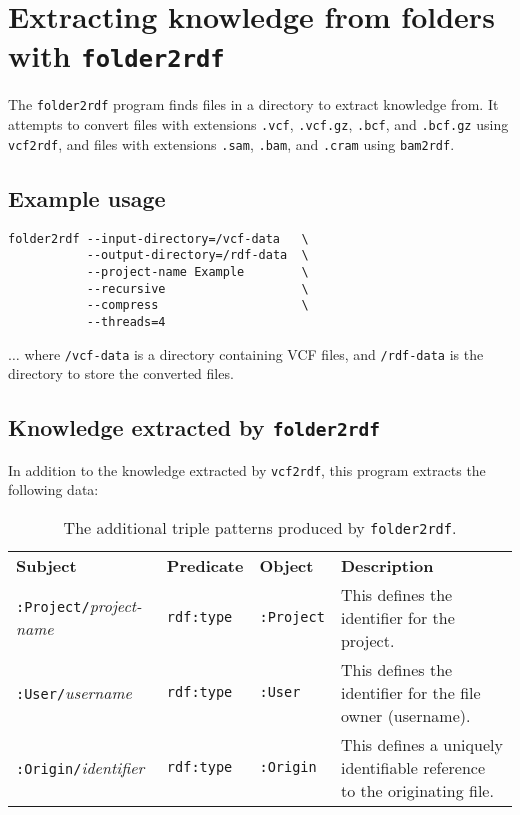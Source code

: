 \section{Extracting knowledge from folders with \texttt{folder2rdf}}
\label{sec:folder2rdf}

  The \texttt{folder2rdf} program finds files in a directory to extract
  knowledge from.  It attempts to convert files with extensions
  \texttt{.vcf}, \texttt{.vcf.gz}, \texttt{.bcf}, and \texttt{.bcf.gz}
  using \texttt{vcf2rdf}, and files with extensions \texttt{.sam},
  \texttt{.bam}, and \texttt{.cram} using \texttt{bam2rdf}.

\subsection{Example usage}

\begin{siderules}
\begin{verbatim}
folder2rdf --input-directory=/vcf-data   \
           --output-directory=/rdf-data  \
           --project-name Example        \
           --recursive                   \
           --compress                    \
           --threads=4
\end{verbatim}
\end{siderules}

  $\ldots{}$ where \texttt{/vcf-data} is a directory containing VCF files,
  and \texttt{/rdf-data} is the directory to store the converted files.

\subsection{Knowledge extracted by \texttt{folder2rdf}}

  In addition to the knowledge extracted by \texttt{vcf2rdf}, this program
  extracts the following data:

  \begin{table}[H]
    \begin{tabularx}{\textwidth}{*{3}{!{\VRule[-1pt]}l}!{\VRule[-1pt]}L}
      \headrow
      \textbf{Subject} & \textbf{Predicate} & \textbf{Object}
      & \textbf{Description}\\
      \evenrow
      \texttt{:Project/}\emph{project-name} & \texttt{rdf:type} & \texttt{:Project}
      & This defines the identifier for the project.\\
      \oddrow
      \texttt{:User/}\emph{username} & \texttt{rdf:type} & \texttt{:User}
      & This defines the identifier for the file owner (username).\\
      \evenrow
      \texttt{:Origin/}\emph{identifier} & \texttt{rdf:type} & \texttt{:Origin}
      & This defines a uniquely identifiable reference to the originating file.\\
    \end{tabularx}
    \caption{\small The additional triple patterns produced by \texttt{folder2rdf}.}
    \label{table:folder2rdf-ontology}
  \end{table}

